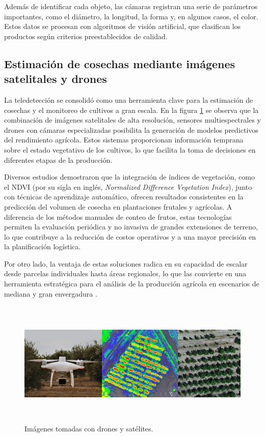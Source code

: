 
Además de identificar cada objeto, las cámaras registran una serie de parámetros importantes, como el diámetro, la longitud, la forma y, en algunos casos, el color. Estos datos se procesan con algoritmos de visión artificial, que clasifican los productos según criterios preestablecidos de calidad.

\subsection{Estimación de cosechas mediante imágenes satelitales y drones}

La teledetección se consolidó como una herramienta clave para la estimación de cosechas y el monitoreo de cultivos a gran escala. En la figura \ref{fig:drones_en_cultivos} se observa que la combinación de imágenes satelitales de alta resolución, sensores multiespectrales y drones con cámaras especializadas posibilita la generación de modelos predictivos del rendimiento agrícola. Estos sistemas proporcionan información temprana sobre el estado vegetativo de los cultivos, lo que facilita la toma de decisiones en diferentes etapas de la producción.

Diversos estudios demostraron que la integración de índices de vegetación, como el NDVI (por su sigla en inglés, \textit{Normalized Difference Vegetation Index}), junto con técnicas de aprendizaje automático, ofrecen resultados consistentes en la predicción del volumen de cosecha en plantaciones frutales y agrícolas. A diferencia de los métodos manuales de conteo de frutos, estas tecnologías permiten la evaluación periódica y no invasiva de grandes extensiones de terreno, lo que contribuye a la reducción de costos operativos y a una mayor precisión en la planificación logística.

Por otro lado, la ventaja de estas soluciones radica en su capacidad de escalar desde parcelas individuales hasta áreas regionales, lo que las convierte en una herramienta estratégica para el análisis de la producción agrícola en escenarios de mediana y gran envergadura \citep{Hobart2025}.

\vspace{1cm}
\begin{figure}[htbp]
	\centering
	\includegraphics[width=1\textwidth, height=6cm]{./Figures/drones_en_cultivos.jpg}
	\caption{Imágenes tomadas con drones y satélites\protect\footnotemark.}
	\label{fig:drones_en_cultivos}
\end{figure}
\vspace{1cm}

